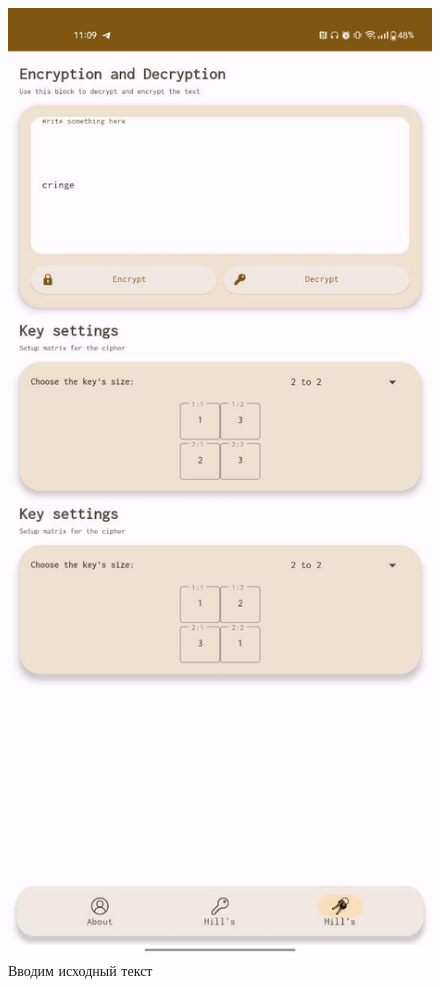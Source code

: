 \documentclass[a4paper]{article}
\begin{document}
\begin{figure}[H]
\begin{minipage}{0.3\textwidth}
        \caption{Вводим исходный текст}
    \end{minipage}
    \hfill
    \begin{minipage}{0.3\textwidth}
        \centering
        \includegraphics[width=\textwidth]{02_0005}

\end{minipage}
\end{figure}
\end{document}
